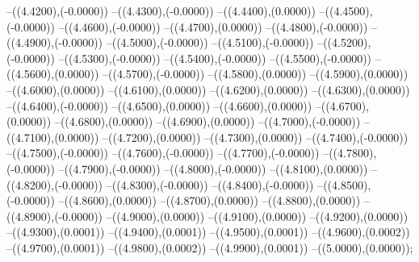 {	--({\sx*(4.4200)},{\sy*(-0.0000)})
	--({\sx*(4.4300)},{\sy*(-0.0000)})
	--({\sx*(4.4400)},{\sy*(0.0000)})
	--({\sx*(4.4500)},{\sy*(-0.0000)})
	--({\sx*(4.4600)},{\sy*(-0.0000)})
	--({\sx*(4.4700)},{\sy*(0.0000)})
	--({\sx*(4.4800)},{\sy*(-0.0000)})
	--({\sx*(4.4900)},{\sy*(-0.0000)})
	--({\sx*(4.5000)},{\sy*(-0.0000)})
	--({\sx*(4.5100)},{\sy*(-0.0000)})
	--({\sx*(4.5200)},{\sy*(-0.0000)})
	--({\sx*(4.5300)},{\sy*(-0.0000)})
	--({\sx*(4.5400)},{\sy*(-0.0000)})
	--({\sx*(4.5500)},{\sy*(-0.0000)})
	--({\sx*(4.5600)},{\sy*(0.0000)})
	--({\sx*(4.5700)},{\sy*(-0.0000)})
	--({\sx*(4.5800)},{\sy*(0.0000)})
	--({\sx*(4.5900)},{\sy*(0.0000)})
	--({\sx*(4.6000)},{\sy*(0.0000)})
	--({\sx*(4.6100)},{\sy*(0.0000)})
	--({\sx*(4.6200)},{\sy*(0.0000)})
	--({\sx*(4.6300)},{\sy*(0.0000)})
	--({\sx*(4.6400)},{\sy*(-0.0000)})
	--({\sx*(4.6500)},{\sy*(0.0000)})
	--({\sx*(4.6600)},{\sy*(0.0000)})
	--({\sx*(4.6700)},{\sy*(0.0000)})
	--({\sx*(4.6800)},{\sy*(0.0000)})
	--({\sx*(4.6900)},{\sy*(0.0000)})
	--({\sx*(4.7000)},{\sy*(-0.0000)})
	--({\sx*(4.7100)},{\sy*(0.0000)})
	--({\sx*(4.7200)},{\sy*(0.0000)})
	--({\sx*(4.7300)},{\sy*(0.0000)})
	--({\sx*(4.7400)},{\sy*(-0.0000)})
	--({\sx*(4.7500)},{\sy*(-0.0000)})
	--({\sx*(4.7600)},{\sy*(-0.0000)})
	--({\sx*(4.7700)},{\sy*(-0.0000)})
	--({\sx*(4.7800)},{\sy*(-0.0000)})
	--({\sx*(4.7900)},{\sy*(-0.0000)})
	--({\sx*(4.8000)},{\sy*(-0.0000)})
	--({\sx*(4.8100)},{\sy*(0.0000)})
	--({\sx*(4.8200)},{\sy*(-0.0000)})
	--({\sx*(4.8300)},{\sy*(-0.0000)})
	--({\sx*(4.8400)},{\sy*(-0.0000)})
	--({\sx*(4.8500)},{\sy*(-0.0000)})
	--({\sx*(4.8600)},{\sy*(0.0000)})
	--({\sx*(4.8700)},{\sy*(0.0000)})
	--({\sx*(4.8800)},{\sy*(0.0000)})
	--({\sx*(4.8900)},{\sy*(-0.0000)})
	--({\sx*(4.9000)},{\sy*(0.0000)})
	--({\sx*(4.9100)},{\sy*(0.0000)})
	--({\sx*(4.9200)},{\sy*(0.0000)})
	--({\sx*(4.9300)},{\sy*(0.0001)})
	--({\sx*(4.9400)},{\sy*(0.0001)})
	--({\sx*(4.9500)},{\sy*(0.0001)})
	--({\sx*(4.9600)},{\sy*(0.0002)})
	--({\sx*(4.9700)},{\sy*(0.0001)})
	--({\sx*(4.9800)},{\sy*(0.0002)})
	--({\sx*(4.9900)},{\sy*(0.0001)})
	--({\sx*(5.0000)},{\sy*(0.0000)});
}
